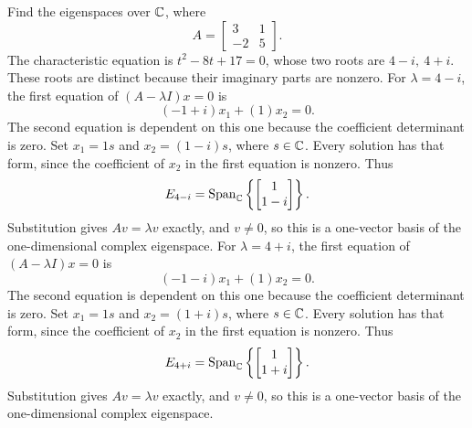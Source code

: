 \goal Find the eigenspaces over $\mathbb{C}$, where
\[A=\begin{bmatrix}3&1\\-2&5\end{bmatrix}.\]
The characteristic equation is $t^{2} - 8 t + 17=0$, whose two roots are $4 - i,\ 4 + i$. These roots are distinct because their imaginary parts are nonzero.
For $\lambda=4 - i$, the first equation of $(A-\lambda I)x=0$ is
\[(-1 + i)x_1+(1)x_2=0.\]
The second equation is dependent on this one because the coefficient determinant is zero. Set $x_1=1s$ and $x_2=(1 - i)s$, where $s\in\mathbb{C}$. Every solution has that form, since the coefficient of $x_2$ in the first equation is nonzero. Thus
\[E_{4 - i}=\operatorname{Span}_{\mathbb{C}}\left\{\begin{bmatrix}1\\1 - i\end{bmatrix}\right\}.\]
Substitution gives $Av=\lambda v$ exactly, and $v\ne0$, so this is a one-vector basis of the one-dimensional complex eigenspace.
For $\lambda=4 + i$, the first equation of $(A-\lambda I)x=0$ is
\[(-1 - i)x_1+(1)x_2=0.\]
The second equation is dependent on this one because the coefficient determinant is zero. Set $x_1=1s$ and $x_2=(1 + i)s$, where $s\in\mathbb{C}$. Every solution has that form, since the coefficient of $x_2$ in the first equation is nonzero. Thus
\[E_{4 + i}=\operatorname{Span}_{\mathbb{C}}\left\{\begin{bmatrix}1\\1 + i\end{bmatrix}\right\}.\]
Substitution gives $Av=\lambda v$ exactly, and $v\ne0$, so this is a one-vector basis of the one-dimensional complex eigenspace.


